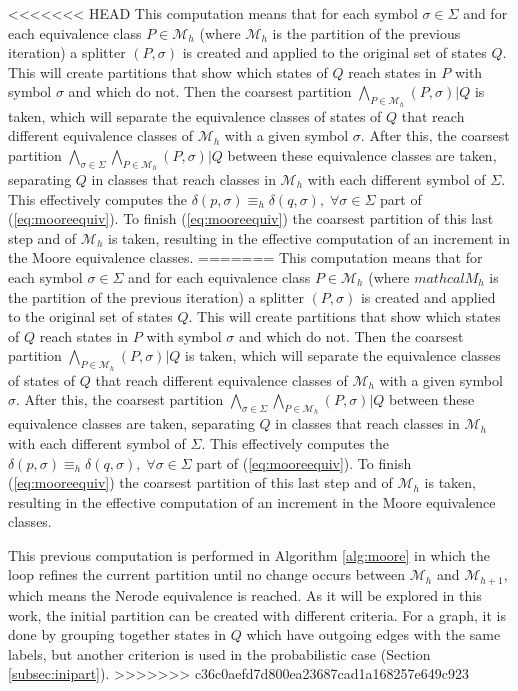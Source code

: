{<<<<<<< HEAD
\noindent This computation means that for each symbol $\sigma\in\Sigma$ and for each equivalence class $P\in\mathcal{M}_h$ (where $\mathcal{M}_h$ is the partition of the previous iteration) a splitter $(P,\sigma)$ is created and applied to the original set of states $Q$. This will create partitions that show which states of $Q$ reach states in $P$ with symbol $\sigma$ and which do not. Then the coarsest partition $\bigwedge_{P\in\mathcal{M}_h}(P,\sigma)|Q$ is taken, which will separate the equivalence classes of states of $Q$ that reach different equivalence classes of $\mathcal{M}_h$ with a given symbol $\sigma$. After this, the coarsest partition $\bigwedge_{\sigma\in\Sigma} \bigwedge_{P\in\mathcal{M}_h}(P,\sigma)|Q$ between these equivalence classes are taken, separating $Q$ in classes that reach classes in $\mathcal{M}_h$ with each different symbol of $\Sigma$. This effectively computes the $\delta(p,\sigma) \equiv_h \delta(q,\sigma), \; \forall \sigma \in \Sigma$ part of (\ref{eq:mooreequiv}). To finish (\ref{eq:mooreequiv}) the coarsest partition of this last step and of $\mathcal{M}_h$ is taken, resulting in the effective computation of an increment in the Moore equivalence classes.
=======
\noindent This computation means that for each symbol $\sigma\in\Sigma$ and for each equivalence class $P\in\mathcal{M}_h$ (where $mathcal{M}_h$ is the partition of the previous iteration) a splitter $(P,\sigma)$ is created and applied to the original set of states $Q$. This will create partitions that show which states of $Q$ reach states in $P$ with symbol $\sigma$ and which do not. Then the coarsest partition $\bigwedge_{P\in\mathcal{M}_h}(P,\sigma)|Q$ is taken, which will separate the equivalence classes of states of $Q$ that reach different equivalence classes of $\mathcal{M}_h$ with a given symbol $\sigma$. After this, the coarsest partition $\bigwedge_{\sigma\in\Sigma} \bigwedge_{P\in\mathcal{M}_h}(P,\sigma)|Q$ between these equivalence classes are taken, separating $Q$ in classes that reach classes in $\mathcal{M}_h$ with each different symbol of $\Sigma$. This effectively computes the $\delta(p,\sigma) \equiv_h \delta(q,\sigma), \; \forall \sigma \in \Sigma$ part of (\ref{eq:mooreequiv}). To finish (\ref{eq:mooreequiv}) the coarsest partition of this last step and of $\mathcal{M}_h$ is taken, resulting in the effective computation of an increment in the Moore equivalence classes.

 This previous computation is performed in Algorithm \ref{alg:moore} in which the loop refines the current partition until no change occurs between $\mathcal{M}_h$ and $\mathcal{M}_{h+1}$, which means the Nerode equivalence is reached. As it will be explored in this work, the initial partition can be created with different criteria. For a graph, it is done by grouping together states in $Q$ which have outgoing edges with the same labels, but another criterion is used in the probabilistic case (Section \ref{subsec:inipart}).
>>>>>>> c36c0aefd7d800ea23687cad1a168257e649c923

}

